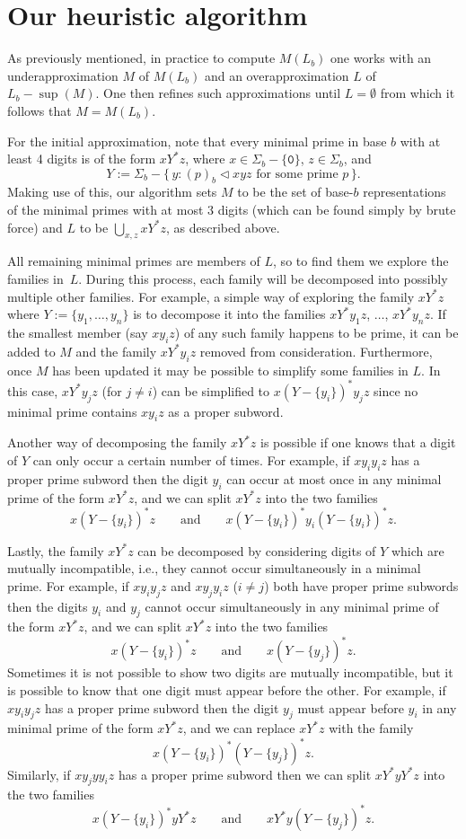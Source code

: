 \documentclass[12pt]{article}
\def\subw{\mathrel{\triangleleft}}
\theoremstyle{plain}
\theoremstyle{definition}
\theoremstyle{remark}
\newcommand{\0}{\mathtt{0}}
\newcommand{\1}{\mathtt{1}}
\newcommand{\2}{\mathtt{2}}
\newcommand{\3}{\mathtt{3}}
\newcommand{\4}{\mathtt{4}}
\newcommand{\5}{\mathtt{5}}
\newcommand{\6}{\mathtt{6}}
\newcommand{\7}{\mathtt{7}}
\newcommand{\8}{\mathtt{8}}
\newcommand{\9}{\mathtt{9}}
\newcommand{\set}[2]{\{\,#1{}:{}#2\,\}}
\begin{document}
\section{Our heuristic algorithm}

As previously mentioned, in practice to compute $M(L_b)$ one works with an underapproximation
$M$ of $M(L_b)$ and an overapproximation $L$ of $L_b-\sup(M)$.
One then refines such approximations until $L=\emptyset$ from which it follows that $M=M(L_b)$.

For the initial approximation, note that every minimal prime in base $b$ with at least 4
digits is of the form $x Y^* z$, where $x\in\Sigma_b-\{\0\}$, $z\in\Sigma_b$, and
\[ Y := \Sigma_b - \set{y}{\text{$(p)_b\subw xyz$ for some prime $p$}} . \]
Making use of this, our algorithm sets $M$ to be the set of base-$b$ representations
of the minimal primes with at most $3$ digits (which can be found simply by brute force)
and $L$ to be $\bigcup_{x,z}xY^*z$, as described above.

All remaining minimal primes are members of $L$, so to find them we explore the families in~$L$.
During this process, each family will be decomposed into possibly multiple other families.
For example, a simple way of exploring the family $xY^*z$ where $Y:=\{y_1,\dotsc,y_n\}$ is to decompose it
into the families $xY^*y_1z$, $\dotsc$, $xY^*y_nz$.  If the smallest member (say $xy_iz$)
of any such family happens to be prime, it can be added to $M$ and the family
$xY^*y_iz$ removed from consideration.  Furthermore, once $M$ has been updated it may be possible
to simplify some families in $L$.  In this case, $xY^*y_jz$ (for $j\neq i$) can be simplified to
$x(Y-\{y_i\})^*y_jz$ since no minimal prime contains $xy_iz$ as a proper subword.

Another way of decomposing %
the family $xY^*z$ is possible if one knows that a digit of $Y$ can only occur a certain number
of times.  For example, if $xy_iy_iz$ has a proper prime subword then the digit $y_i$
can occur at most once in any minimal prime of the form $xY^*z$, and we can split $xY^*z$ into
the two families
\[ x(Y-\{y_i\})^*z \qquad\text{and}\qquad x(Y-\{y_i\})^*y_i(Y-\{y_i\})^*z .\]

Lastly, the family $xY^*z$ can be decomposed by considering digits of $Y$ which are mutually incompatible,
i.e., they cannot occur simultaneously in a minimal prime.  For example, if $xy_iy_jz$ and $xy_jy_iz$ ($i\neq j$)
both have proper prime subwords then the digits $y_i$ and $y_j$ cannot occur simultaneously in any minimal
prime of the form $xY^*z$, and we can split $xY^*z$ into the two families
\[ x(Y-\{y_i\})^*z \qquad\text{and}\qquad x(Y-\{y_j\})^*z . \]
Sometimes it is not possible to show two digits are mutually incompatible, but it is possible to know that
one digit must appear before the other.  For example, if $xy_iy_jz$ has a proper prime subword then the digit
$y_j$ must appear before $y_i$ in any minimal prime of the form $xY^*z$, and we can replace $xY^*z$
with the family
\[ x(Y-\{y_i\})^*(Y-\{y_j\})^*z . \]
Similarly, if $xy_jyy_iz$ has a proper prime subword then we can split $xY^*yY^*z$ into the two families
\[ x(Y-\{y_i\})^*yY^*z \qquad\text{and}\qquad xY^*y(Y-\{y_j\})^*z . \]
\end{document}
